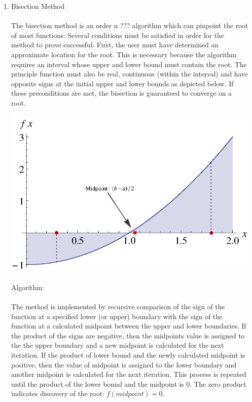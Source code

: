 \documentclass{report}
\begin{document}
\begin{enumerate}
\item Bisection Method
\\
\\The bisection method is an order n ??? algorithm which can pinpoint the root of most functions. Several conditions must be satisfied in order for the method to prove successful. First, the user must have determined an approximate location for the root. This is necessary because the algorithm requires an interval whose upper and lower bound must contain the root. The principle function must also be real, continuous (within the interval) and have opposite signs at the initial upper and lower bounds as depicted below. If these preconditions are met, the bisection is guaranteed to converge on a root.
\\
\\\includegraphics[scale=1.3]{bisection.eps}
\\
\\Algorithm:  
\\
\\The method is implemented by recursive comparison of the sign of the function at a specified lower (or upper) boundary with the sign of the function at a calculated midpoint between the upper and lower boundaries. If the product of the signs are negative, then the midpoints value is assigned to the the upper boundary and a new midpoint is calculated for the next iteration. If the product of lower bound and the newly calculated midpoint is positive, then the value of midpoint is assigned to the lower boundary and another midpoint is calculated for the next iteration. This process is repeated until the product of the lower bound and the midpoint is $0$. The zero product indicates discovery of the root: $f(midpoint)=0$.

\end{enumerate}
\end{document}

